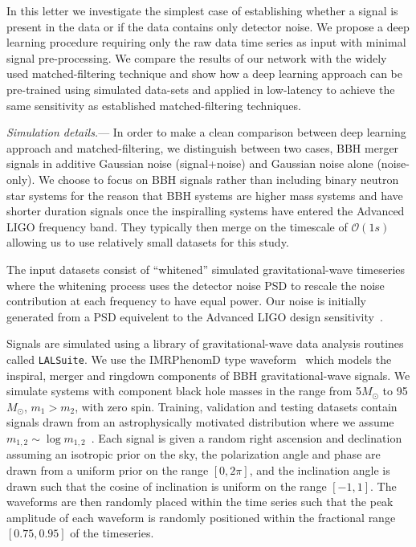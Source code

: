 \documentclass[%
showpacs,
 amsmath,amssymb,
 aps,
 twocolumn,
 prl,
 reprint,
floatfix,
]{revtex4-1}
\begin{document}
%
%
In this letter we investigate the simplest case of establishing whether a
signal is present in the data or if the data contains only detector noise. We
propose a deep learning procedure requiring only the raw data time series as
input with minimal signal pre-processing. We compare the results of our network
with the widely used matched-filtering technique and show how a deep learning
approach can be pre-trained using simulated data-sets and applied in
low-latency to achieve the same sensitivity as established matched-filtering
techniques. 

%
%
\textit{Simulation details.}--- 
%
%
In order to make a clean comparison between deep learning approach and
matched-filtering, we distinguish between two cases, \ac{BBH} merger
signals in additive Gaussian noise (signal+noise) and Gaussian noise alone
(noise-only). We choose to focus on \ac{BBH} signals rather than including
binary neutron star systems for the reason that \ac{BBH} systems are higher
mass systems and have shorter duration signals once the inspiralling systems
have entered the Advanced LIGO frequency band. They typically then merge on the
timescale of $\mathcal{O}(1 s)$ allowing us to use relatively small datasets
for this study. 

%
%
The input datasets consist of ``whitened'' simulated gravitational-wave
timeseries where the whitening process uses the detector noise \ac{PSD} to  
rescale the noise contribution at each frequency to have equal power. 
Our noise is initially generated from a \ac{PSD} equivelent to the Advanced
LIGO design sensitivity~\cite{2016LRR....19....1A}. 

%
%
Signals are simulated using a library of gravitational-wave data analysis
routines called \texttt{LALSuite}. We use the IMRPhenomD type
waveform~\cite{PhysRevD.93.044006, PhysRevD.93.044007} which models the
inspiral, merger and ringdown components of \ac{BBH} gravitational-wave
signals. We simulate systems with component black hole masses in the range from
5\(M_\odot\) to 95\(M_\odot\), $m_{1} > m_{2}$, with zero spin.
Training, validation and testing datasets contain signals drawn from an
astrophysically motivated distribution where we assume
$m_{1,2}\sim\log{m_{1,2}}$~\cite{PhysRevX.6.041015}. Each signal is given a
random right ascension and declination assuming an isotropic prior on the sky,
the polarization angle and phase are drawn from a uniform prior on the range
$[0,2\pi]$, and the inclination angle is drawn such that the cosine of
inclination is uniform on the range $[-1,1]$. The waveforms are then randomly
placed within the time series such that the peak amplitude of each waveform is
randomly positioned within the fractional range $[0.75,0.95]$ of the
timeseries. 
\end{document}
